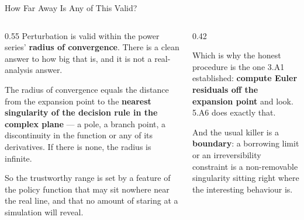 \begin{frame}{How Far Away Is Any of This Valid?}
\begin{columns}[T]
\begin{column}{0.55\textwidth}
\small
Perturbation is valid within the power series' \textbf{radius of convergence}. There is a clean answer to how big that is, and it is not a real-analysis answer.
\medskip

\begin{conceptbox}[title=\textbf{From complex analysis}]\small
The radius of convergence equals the distance from the expansion point to the \textbf{nearest singularity of the decision rule in the complex plane} --- a pole, a branch point, a discontinuity in the function or any of its derivatives. If there is none, the radius is infinite.
\end{conceptbox}
\medskip
So the trustworthy range is set by a feature of the policy function that may sit nowhere near the real line, and that no amount of staring at a simulation will reveal.
\end{column}
\begin{column}{0.42\textwidth}
\begin{takeawaybox}\footnotesize
Which is why the honest procedure is the one 3.A1 established: \textbf{compute Euler residuals off the expansion point} and look. 5.A6 does exactly that.
\end{takeawaybox}
\medskip
\begin{cautionbox}\footnotesize
And the usual killer is a \textbf{boundary}: a borrowing limit or an irreversibility constraint is a non-removable singularity sitting right where the interesting behaviour is.
\end{cautionbox}
\end{column}
\end{columns}
\vspace{1mm}
\end{frame}


